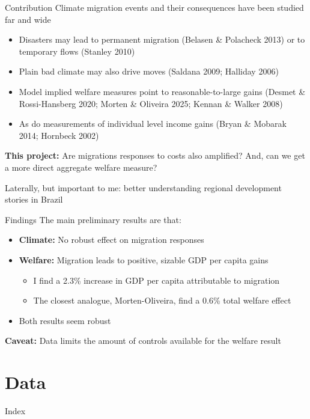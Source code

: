 \documentclass[aspectratio=169]{beamer}
\begin{document}
\begin{frame}{Contribution}
Climate migration events and their consequences have been studied far and wide
\begin{itemize}
    \item Disasters may lead to permanent migration (Belasen \& Polacheck 2013) or to temporary flows (Stanley 2010)
    \item Plain bad climate may also drive moves (Saldana 2009; Halliday 2006)
    \item Model implied welfare measures point to reasonable-to-large gains (Desmet \& Rossi-Hansberg 2020; Morten \& Oliveira 2025; Kennan \& Walker 2008)
    \item As do measurements of individual level income gains (Bryan \& Mobarak 2014; Hornbeck 2002)
\end{itemize}
\textbf{This project:} Are migrations responses to costs also amplified? And, can we get a more direct aggregate welfare measure?
\par
Laterally, but important to me: better understanding regional development stories in Brazil
\end{frame}


\begin{frame}{Findings}
The main preliminary results are that:
\begin{itemize}
    \item \textbf{Climate:} No robust effect on migration responses
    \item \textbf{Welfare:} Migration leads to positive, sizable GDP per capita gains
    \begin{itemize}
        \item I find a 2.3\% increase in GDP per capita attributable to migration
        \item The closest analogue, Morten-Oliveira, find a 0.6\% total welfare effect
    \end{itemize}
    \item Both results seem robust 
\end{itemize}

\vspace{0.5em}
\textbf{Caveat:} Data limits the amount of controls available for the welfare result
\end{frame}

\section{Data}
\begin{frame}{Index}
\tableofcontents[currentsection]
\end{frame}
\end{document}
